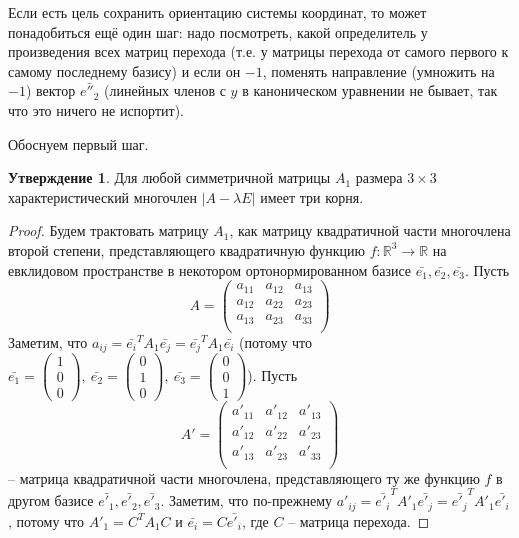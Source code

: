 \documentclass[a4paper, 12pt]{article}
\theoremstyle{definition}
\newtheorem*{subtheorem}{Утверждение}
\begin{document}
Если есть цель сохранить ориентацию системы координат, то может понадобиться ещё один шаг: надо посмотреть, какой определитель у произведения всех матриц перехода (т.е. у матрицы перехода от самого первого к самому последнему базису) и если он $-1$, поменять направление (умножить на $-1$) вектор $\bar{e''_2}$ (линейных членов с $y$ в каноническом уравнении не бывает, так что это ничего не испортит).

Обоснуем первый шаг.
\begin{subtheorem}
    Для любой симметричной матрицы $A_1$ размера $3 \times 3$ характеристический многочлен $|A - \lambda E|$ имеет три корня.
\end{subtheorem}
\begin{proof}
    Будем трактовать матрицу $A_1$, как матрицу квадратичной части многочлена второй степени, представляющего квадратичную функцию $f: \mathbb{R}^3 \to \mathbb{R}$ на евклидовом пространстве в некотором ортонормированном базисе $\bar{e_1}, \bar{e_2}, \bar{e_3}$.
    Пусть
    \[ A = 
    \begin{pmatrix}
        a_{11} & a_{12} & a_{13} \\
        a_{12} & a_{22} & a_{23} \\
        a_{13} & a_{23} & a_{33} \\
    \end{pmatrix}
    \]
    Заметим, что $a_{ij} = \bar{e_i}^T A_1 \bar{e_j} = \bar{e_j}^T A_1 \bar{e_i}$ (потому что $\bar{e_1} = \begin{pmatrix}1\\0\\0\end{pmatrix}, \ \bar{e_2} = \begin{pmatrix}0\\1\\0\end{pmatrix}, \ \bar{e_3} = \begin{pmatrix}0\\0\\1\end{pmatrix}$).
    Пусть
    \[ A' = 
    \begin{pmatrix}
        a'_{11} & a'_{12} & a'_{13} \\
        a'_{12} & a'_{22} & a'_{23} \\
        a'_{13} & a'_{23} & a'_{33} \\
    \end{pmatrix}
    \] – матрица квадратичной части многочлена, представляющего ту же функцию $f$ в другом базисе $\bar{e'_1}, \bar{e'_2}, \bar{e'_3}$.
    Заметим, что по-прежнему $a'_{ij} = \bar{e'_i}^T A'_1 \bar{e'_j} = \bar{e'_j}^T A'_1 \bar{e'_i}$, потому что $A'_1 = C^T A_1 C$
    и $\bar{e_i} = C \bar{e'_i}$, где $C$ – матрица перехода.


\end{proof}
\end{document}
